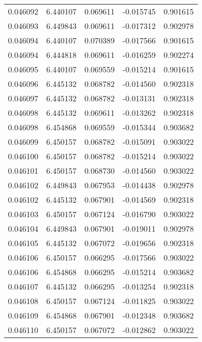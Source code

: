 \begin{tabular}{lrrrr}
0.046092    &  6.440107 &  0.069611 & -0.015745 &             0.901615 \\
0.046093    &  6.449843 &  0.069611 & -0.017312 &             0.902978 \\
0.046094    &  6.440107 &  0.070389 & -0.017566 &             0.901615 \\
0.046094    &  6.444818 &  0.069611 & -0.016259 &             0.902274 \\
0.046095    &  6.440107 &  0.069559 & -0.015214 &             0.901615 \\
0.046096    &  6.445132 &  0.068782 & -0.014560 &             0.902318 \\
0.046097    &  6.445132 &  0.068782 & -0.013131 &             0.902318 \\
0.046098    &  6.445132 &  0.069611 & -0.013262 &             0.902318 \\
0.046098    &  6.454868 &  0.069559 & -0.015344 &             0.903682 \\
0.046099    &  6.450157 &  0.068782 & -0.015091 &             0.903022 \\
0.046100    &  6.450157 &  0.068782 & -0.015214 &             0.903022 \\
0.046101    &  6.450157 &  0.068730 & -0.014560 &             0.903022 \\
0.046102    &  6.449843 &  0.067953 & -0.014438 &             0.902978 \\
0.046102    &  6.445132 &  0.067901 & -0.014569 &             0.902318 \\
0.046103    &  6.450157 &  0.067124 & -0.016790 &             0.903022 \\
0.046104    &  6.449843 &  0.067901 & -0.019011 &             0.902978 \\
0.046105    &  6.445132 &  0.067072 & -0.019656 &             0.902318 \\
0.046106    &  6.450157 &  0.066295 & -0.017566 &             0.903022 \\
0.046106    &  6.454868 &  0.066295 & -0.015214 &             0.903682 \\
0.046107    &  6.445132 &  0.066295 & -0.013254 &             0.902318 \\
0.046108    &  6.450157 &  0.067124 & -0.011825 &             0.903022 \\
0.046109    &  6.454868 &  0.067901 & -0.012348 &             0.903682 \\
0.046110    &  6.450157 &  0.067072 & -0.012862 &             0.903022 \\

\end{tabular}
